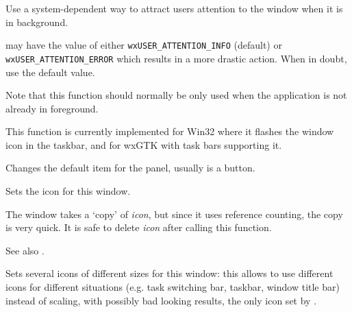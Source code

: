 Use a system-dependent way to attract users attention to the window when it is
in background.

 may have the value of either \texttt{wxUSER\_ATTENTION\_INFO}
(default) or \texttt{wxUSER\_ATTENTION\_ERROR} which results in a more drastic
action. When in doubt, use the default value.

Note that this function should normally be only used when the application is
not already in foreground.

This function is currently implemented for Win32 where it flashes the
window icon in the taskbar, and for wxGTK with task bars supporting it.


\label{wxtoplevelwindowsetdefaultitem}


Changes the default item for the panel, usually  is a button.




\label{wxtoplevelwindowseticon}


Sets the icon for this window.




The window takes a `copy' of {\it icon}, but since it uses reference
counting, the copy is very quick. It is safe to delete {\it icon} after
calling this function.

See also .


\label{wxtoplevelwindowseticons}


Sets several icons of different sizes for this window: this allows to use
different icons for different situations (e.g. task switching bar, taskbar,
window title bar) instead of scaling, with possibly bad looking results, the
only icon set by .



